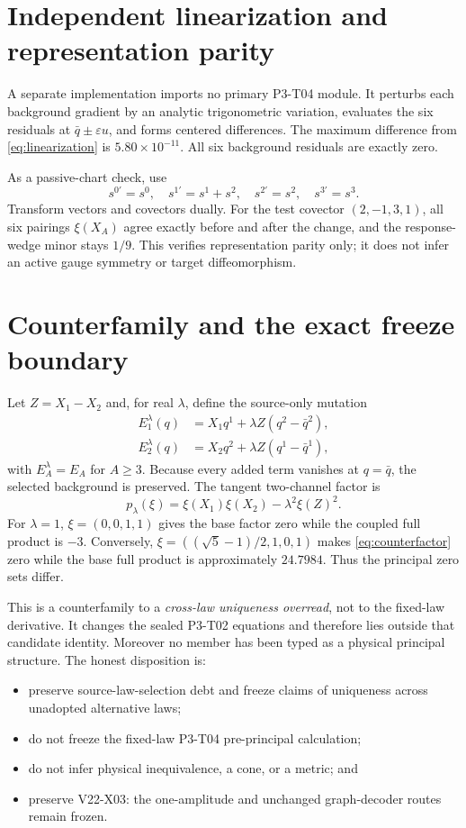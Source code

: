 \documentclass[11pt]{article}
\newcommand{\qbar}{\bar q}
\begin{document}
\section{Independent linearization and representation parity}

A separate implementation imports no primary P3-T04 module.  It perturbs each
background gradient by an analytic trigonometric variation, evaluates the six
residuals at $\qbar\pm\varepsilon u$, and forms centered differences.  The
maximum difference from \eqref{eq:linearization} is
$5.80\times10^{-11}$.  All six background residuals are exactly zero.

As a passive-chart check, use
\[
s^{0\prime}=s^0,\quad s^{1\prime}=s^1+s^2,\quad
s^{2\prime}=s^2,\quad s^{3\prime}=s^3.
\]
Transform vectors and covectors dually.  For the test covector
$(2,-1,3,1)$, all six pairings $\xi(X_A)$ agree exactly before and after the
change, and the response-wedge minor stays $1/9$.  This verifies representation
parity only; it does not infer an active gauge symmetry or target
diffeomorphism.

\section{Counterfamily and the exact freeze boundary}

Let $Z=X_1-X_2$ and, for real $\lambda$, define the source-only mutation
\begin{align*}
 E_1^{\lambda}(q)&=X_1q^1+\lambda Z(q^2-\qbar^2),\\
 E_2^{\lambda}(q)&=X_2q^2+\lambda Z(q^1-\qbar^1),
\end{align*}
with $E_A^\lambda=E_A$ for $A\ge3$.  Because every added term vanishes at
$q=\qbar$, the selected background is preserved.  The tangent two-channel
factor is
\begin{equation}
 p_\lambda(\xi)=\xi(X_1)\xi(X_2)
       -\lambda^2\xi(Z)^2.
 \label{eq:counterfactor}
\end{equation}
For $\lambda=1$, $\xi=(0,0,1,1)$ gives the base factor zero while the coupled
full product is $-3$.  Conversely,
$\xi=((\sqrt5-1)/2,1,0,1)$ makes \eqref{eq:counterfactor} zero while the base
full product is approximately $24.7984$.  Thus the principal zero sets differ.

This is a counterfamily to a \emph{cross-law uniqueness overread}, not to the
fixed-law derivative.  It changes the sealed P3-T02 equations and therefore
lies outside that candidate identity.  Moreover no member has been typed as a
physical principal structure.  The honest disposition is:
\begin{itemize}[leftmargin=*]
  \item preserve source-law-selection debt and freeze claims of uniqueness
        across unadopted alternative laws;
  \item do not freeze the fixed-law P3-T04 pre-principal calculation;
  \item do not infer physical inequivalence, a cone, or a metric; and
  \item preserve V22-X03: the one-amplitude and unchanged graph-decoder routes
        remain frozen.
\end{itemize}
\end{document}
